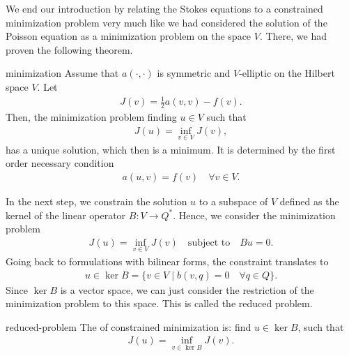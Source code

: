 
\begin{intro}
  We end our introduction by relating the Stokes equations to a
  constrained minimization problem very much like we had considered
  the solution of the Poisson equation as a minimization problem on
  the space $V$. There, we had proven the following theorem.
\end{intro}

\begin{Theorem}{minimization}
  Assume that $a(\cdot,\cdot)$ is symmetric and $V$-elliptic on the Hilbert
  space $V$. Let
  \begin{gather}
    J(v) = \tfrac12 a(v,v) - f(v).    
  \end{gather}
  Then, the minimization problem finding $u\in V$ such that
  \begin{align}
    J(u) =\inf_{v\in V} J(v),
  \end{align}
  has a unique solution, which then is a minimum. It is determined by
  the first order necessary condition
  \begin{gather}
    a(u,v) = f(v) \quad\forall v\in V.
  \end{gather}
\end{Theorem}

\begin{intro}
  In the next step, we constrain the solution $u$ to a subspace of $V$
  defined as the kernel of the linear operator $B: V\to Q^*$. Hence,
  we consider the minimization problem
  \begin{gather}
    J(u) =\inf_{v\in V} J(v) \quad
    \text{subject to}\quad
    Bu = 0.
  \end{gather}
  Going back to formulations with bilinear forms, the constraint
  translates to
  \begin{gather}
    u\in \ker B = \bigl\{ v\in V \;\big|\;
    b(v,q)=0 \quad\forall q\in Q\}.
  \end{gather}
  Since $\ker B$ is a vector space, we can just consider the
  restriction of the minimization problem to this space. This is
  called the reduced problem.
\end{intro}

\begin{Definition}{reduced-problem}
  The  of constrained minimization
  is: find $u\in \ker B$, such that
  \begin{gather}
    J(u) =\inf_{v\in \ker B} J(v).
  \end{gather}
\end{Definition}

